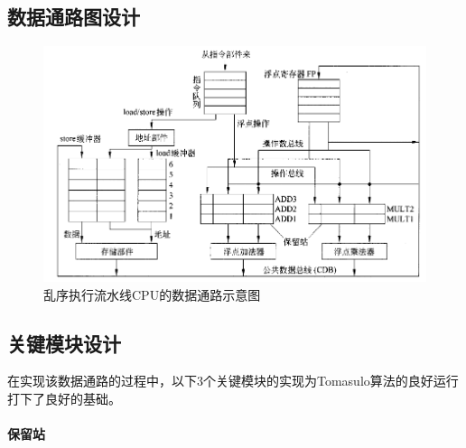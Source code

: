 \documentclass[twoside]{article}
\begin{document}
\subsection{数据通路图设计}
\begin{figure}[htp]
    \centering
    \includegraphics[width=13cm]{"./figure/dataPathDiagram.png"}   
    \caption{乱序执行流水线CPU的数据通路示意图}
    \label{fig:dataPathDiagram}
\end{figure}

\subsection{关键模块设计}
在实现该数据通路的过程中，以下3个关键模块的实现为Tomasulo算法的良好运行打下了良好的基础。
\paragraph{保留站}
\end{document}
